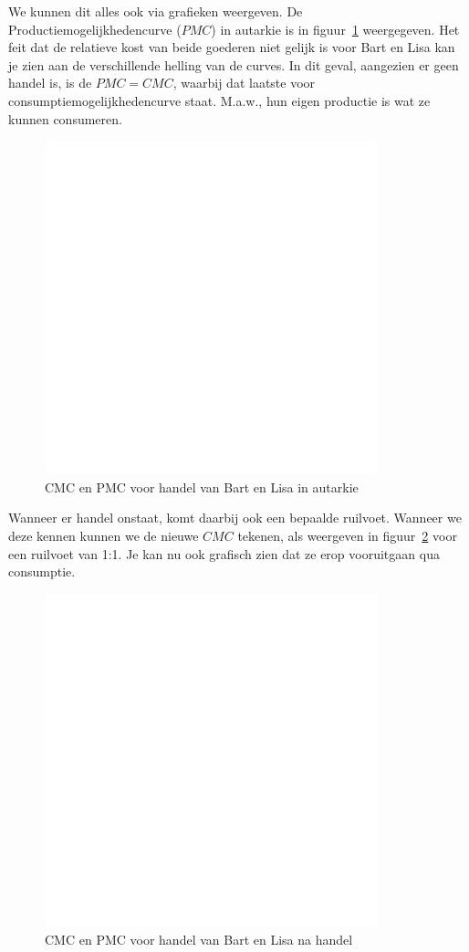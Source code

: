 We kunnen dit alles ook via grafieken weergeven. De Productiemogelijkhedencurve ($PMC$) in autarkie is in figuur~\ref{fig:cmcEnPmcAutarkie} weergegeven. Het feit dat de relatieve kost van beide goederen niet gelijk is voor Bart en Lisa kan je zien aan de verschillende helling van de curves. In dit geval, aangezien er geen handel is, is de $PMC = CMC$, waarbij dat laatste voor consumptiemogelijkhedencurve staat. M.a.w., hun eigen productie is wat ze kunnen consumeren.
\begin{figure}[htbp]
	\centering
	\includegraphics[scale=0.4]{Images/white.png}
	\caption{CMC en PMC voor handel van Bart en Lisa in autarkie}
	\label{fig:cmcEnPmcAutarkie}
\end{figure}

Wanneer er handel onstaat, komt daarbij ook een bepaalde ruilvoet. Wanneer we deze kennen kunnen we de nieuwe $CMC$ tekenen, als weergeven in figuur~\ref{fig:cmcHandel} voor een ruilvoet van 1:1. Je kan nu ook grafisch zien dat ze erop vooruitgaan qua consumptie.
\begin{figure}[htbp]
	\centering
	\includegraphics[scale=0.4]{Images/white.png}
	\caption{CMC en PMC voor handel van Bart en Lisa na handel}
	\label{fig:cmcHandel}
\end{figure}

